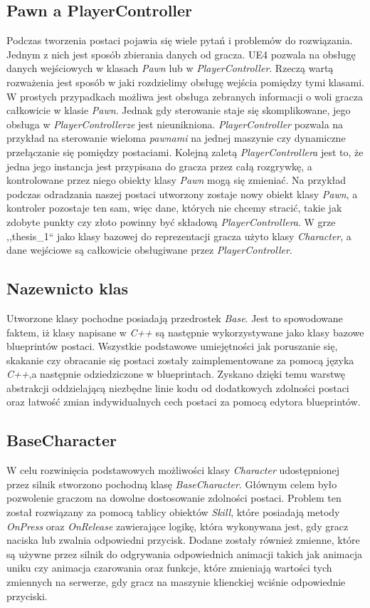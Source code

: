\documentclass[multip]{SGGW-thesis}
\begin{document}
	\subsection{Pawn a PlayerController}
	Podczas tworzenia postaci pojawia się wiele pytań i problemów do rozwiązania.
Jednym z nich jest sposób zbierania danych od gracza. UE4 pozwala na obsługę danych wejściowych w klasach {\em Pawn} lub w {\em PlayerController}. Rzeczą wartą rozważenia jest sposób w jaki rozdzielimy obsługę wejścia pomiędzy tymi klasami\cite{docs-playercontroller}. W prostych przypadkach możliwa jest obsługa zebranych informacji o woli gracza całkowicie w klasie  {\em Pawn}. Jednak gdy sterowanie staje się skomplikowane, jego obsługa w {\em PlayerControllerze} jest nieunikniona.  {\em PlayerController} pozwala na przykład na sterowanie wieloma  {\em pawnami} na jednej maszynie czy dynamiczne przełączanie się pomiędzy postaciami.  Kolejną zaletą  {\em PlayerControllera} jest to, że jedna jego instancja jest przypisana do gracza przez całą rozgrywkę, a kontrolowane przez niego obiekty klasy  {\em Pawn} mogą się zmieniać. Na przykład podczas odradzania naszej postaci utworzony zostaje nowy obiekt klasy  {\em Pawn}, a kontroler pozostaje ten sam, więc dane, których nie chcemy stracić, takie jak zdobyte punkty czy złoto powinny być składową  {\em PlayerControllera}.
\newline \indent W grze ,,thesis\_1`` jako klasy bazowej do reprezentacji gracza użyto klasy  {\em Character}, a dane wejściowe są całkowicie obsługiwane przez  {\em PlayerController}.
	\subsection{Nazewnicto klas}
	Utworzone klasy pochodne posiadają przedrostek  {\em Base}. Jest to spowodowane faktem, iż klasy napisane w  {\em C++} są następnie wykorzystywane jako klasy bazowe blueprintów postaci. Wszystkie podstawowe umiejętności jak poruszanie się, skakanie czy obracanie się postaci zostały zaimplementowane za pomocą języka  {\em C++},a następnie odziedziczone w blueprintach. Zyskano dzięki temu warstwę abstrakcji oddzielającą niezbędne linie kodu od dodatkowych zdolności postaci oraz łatwość zmian indywidualnych cech postaci za pomocą edytora blueprintów.
	\subsection{BaseCharacter}
	W celu rozwinięcia podstawowych możliwości klasy  {\em Character} udostępnionej przez silnik stworzono pochodną klasę  {\em BaseCharacter}. Głównym celem było pozwolenie graczom na dowolne dostosowanie zdolności postaci. Problem ten został rozwiązany za pomocą tablicy obiektów  {\em Skill}, które posiadają metody  {\em OnPress} oraz  {\em OnRelease} zawierające logikę, która wykonywana jest, gdy gracz naciska lub zwalnia odpowiedni przycisk.		
Dodane zostały również zmienne, które są używne przez silnik do odgrywania odpowiednich animacji takich jak animacja uniku czy animacja czarowania oraz funkcje, które zmieniają wartości tych zmiennych na serwerze, gdy gracz na maszynie klienckiej wciśnie odpowiednie przyciski.
\end{document}
